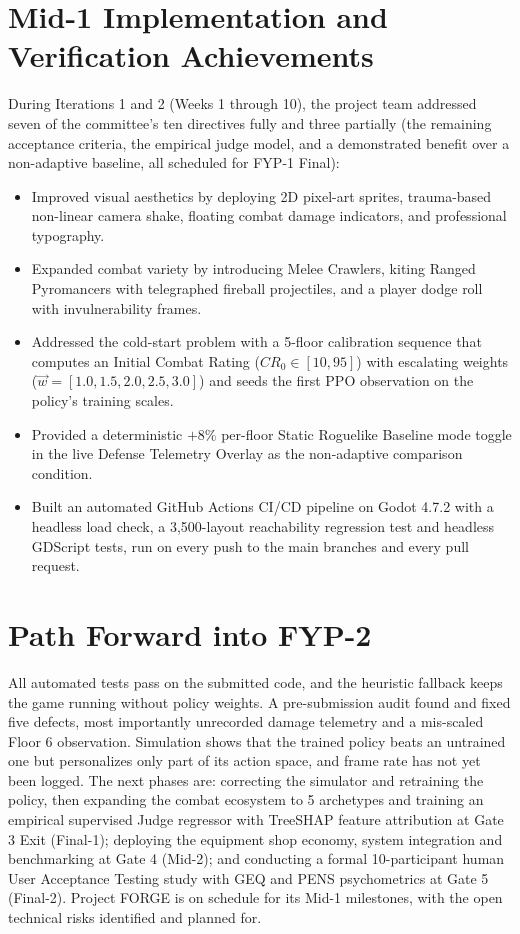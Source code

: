 \section*{Mid-1 Implementation and Verification Achievements}
During Iterations 1 and 2 (Weeks 1 through 10), the project team addressed seven of the committee's ten directives fully and three partially (the remaining acceptance criteria, the empirical judge model, and a demonstrated benefit over a non-adaptive baseline, all scheduled for FYP-1 Final):
\begin{itemize}
    \item Improved visual aesthetics by deploying 2D pixel-art sprites, trauma-based non-linear camera shake, floating combat damage indicators, and professional typography.
    \item Expanded combat variety by introducing Melee Crawlers, kiting Ranged Pyromancers with telegraphed fireball projectiles, and a player dodge roll with invulnerability frames.
    \item Addressed the cold-start problem with a 5-floor calibration sequence that computes an Initial Combat Rating ($CR_0 \in [10, 95]$) with escalating weights ($\vec{w} = [1.0, 1.5, 2.0, 2.5, 3.0]$) and seeds the first PPO observation on the policy's training scales.
    \item Provided a deterministic $+8\%$ per-floor Static Roguelike Baseline mode toggle in the live Defense Telemetry Overlay as the non-adaptive comparison condition.
    \item Built an automated GitHub Actions CI/CD pipeline on Godot 4.7.2 with a headless load check, a 3,500-layout reachability regression test and headless GDScript tests, run on every push to the main branches and every pull request.
\end{itemize}

\section*{Path Forward into FYP-2}
All automated tests pass on the submitted code, and the heuristic fallback keeps the game running without policy weights. A pre-submission audit found and fixed five defects, most importantly unrecorded damage telemetry and a mis-scaled Floor 6 observation. Simulation shows that the trained policy beats an untrained one but personalizes only part of its action space, and frame rate has not yet been logged. The next phases are: correcting the simulator and retraining the policy, then expanding the combat ecosystem to 5 archetypes and training an empirical supervised Judge regressor with TreeSHAP feature attribution at Gate 3 Exit (Final-1); deploying the equipment shop economy, system integration and benchmarking at Gate 4 (Mid-2); and conducting a formal 10-participant human User Acceptance Testing study with GEQ and PENS psychometrics at Gate 5 (Final-2). Project FORGE is on schedule for its Mid-1 milestones, with the open technical risks identified and planned for.
